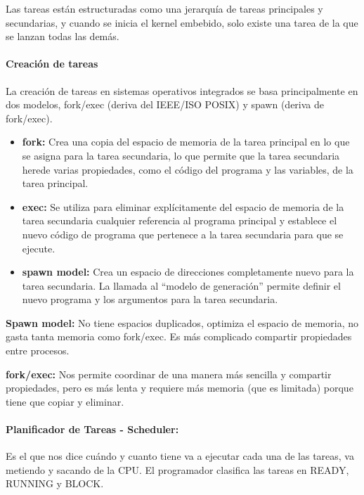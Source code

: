 \documentclass[12pt, twoside, openright]{report} %
\begin{document}
\begin{description}
	      Las tareas están estructuradas como una jerarquía de tareas principales y secundarias, y cuando se inicia el kernel embebido, solo existe una tarea de la que se lanzan todas las demás.


	      \paragraph{Creación de tareas}
	      La creación de tareas en sistemas operativos integrados se basa principalmente en dos modelos, fork/exec (deriva del IEEE/ISO POSIX) y spawn (deriva de fork/exec).

	      \begin{itemize}
		      \item \textbf{fork:} Crea una copia del espacio de memoria de la tarea principal en lo que se asigna para la tarea secundaria, lo que permite que la tarea secundaria herede varias propiedades, como el código del programa y las variables, de la tarea principal.
		      \item \textbf{exec:} Se utiliza para eliminar explícitamente del espacio de memoria de la tarea secundaria cualquier referencia al programa principal y establece el nuevo código de programa que pertenece a la tarea secundaria para que se ejecute.
		      \item \textbf{spawn model:} Crea un espacio de direcciones completamente nuevo para la tarea secundaria. La llamada al “modelo de generación” permite definir el nuevo programa y los argumentos para la tarea secundaria.
	      \end{itemize}

	      \textbf{Spawn model:} No tiene espacios duplicados, optimiza el espacio de memoria, no gasta tanta memoria como fork/exec. Es más complicado compartir propiedades entre procesos.

	      \textbf{fork/exec:} Nos permite coordinar de una manera más sencilla y compartir propiedades, pero es más lenta y requiere más memoria (que es limitada) porque tiene que copiar y eliminar.

	      \paragraph{Planificador de Tareas - Scheduler:} Es el que nos dice cuándo y cuanto tiene va a ejecutar cada una de las tareas, va metiendo y sacando de la CPU. El programador clasifica las tareas en READY, RUNNING y BLOCK.


\end{description}
\end{document}
